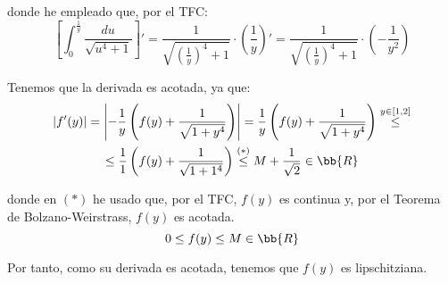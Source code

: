 \begin{ejercicio}
    donde he empleado que, por el TFC:
    \begin{equation*}
        \left[\int_{0}^{\frac{1}{y}} \frac{du}{\sqrt{u^4+1}}\right]' = \frac{1}{\sqrt{\left(\frac{1}{y}\right)^4+1}}\cdot \left(\frac{1}{y}\right)' = \frac{1}{\sqrt{\left(\frac{1}{y}\right)^4+1}}\cdot \left(-\frac{1}{y^2}\right)
    \end{equation*}

    Tenemos que la derivada es acotada, ya que:
    \begin{multline*}
        |f'(y)| = \left|-\frac{1}{y}\left(f(y)+\frac{1}{\sqrt{1+y^4}}\right)\right|
        = \frac{1}{y}\left(f(y)+\frac{1}{\sqrt{1+y^4}}\right)
        \stackrel{y\in[1,2]}{\leq}\\\leq \frac{1}{1} \left(f(y)+\frac{1}{\sqrt{1+1^4}}\right)
        \stackrel{(\ast)}{\leq} M+\frac{1}{\sqrt{2}}\in \bb{R}
    \end{multline*}

    donde en $(\ast)$ he usado que, por el TFC, $f(y)$ es continua y, por el Teorema de Bolzano-Weirstrass, $f(y)$ es acotada.
    \begin{equation*}
        0\leq f(y) \leq M\in \bb{R}
    \end{equation*}

    Por tanto, como su derivada es acotada, tenemos que $f(y)$ es lipschitziana.
\end{ejercicio}

